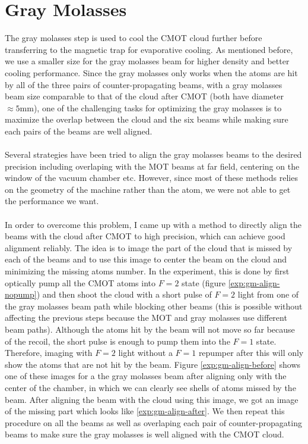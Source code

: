 \section{Gray Molasses}\label{exp:gm}
The gray molasses step is used to cool the CMOT cloud further before transferring to the magnetic trap for evaporative cooling. As mentioned before, we use a smaller size for the gray molasses beam for higher density and better cooling performance. Since the gray molasses only works when the atoms are hit by all of the three pairs of counter-propagating beams, with a gray molasses beam size comparable to that of the cloud after CMOT (both have diameter $\approx5\text{mm}$), one of the challenging tasks for optimizing the gray molasses is to maximize the overlap between the cloud and the six beams while making sure each pairs of the beams are well aligned.\\
\\
Several strategies have been tried to align the gray molasses beams to the desired precision including overlaping with the MOT beams at far field, centering on the window of the vacuum chamber etc. However, since most of these methods relies on the geometry of the machine rather than the atom, we were not able to get the performance we want.\\
\\
In order to overcome this problem, I came up with a method to directly align the beams with the cloud after CMOT to high precision, which can achieve good alignment reliably. The idea is to image the part of the cloud that is missed by each of the beams and to use this image to center the beam on the cloud and minimizing the missing atoms number. In the experiment, this is done by first optically pump all the CMOT atoms into $F=2$ state (figure \ref{exp:gm-align-nopump}) and then shoot the cloud with a short pulse of $F=2$ light from one of the gray molasses beam path while blocking other beams (this is possible without affecting the previous steps because the MOT and gray molasses use different beam paths). Although the atoms hit by the beam will not move so far because of the recoil, the short pulse is enough to pump them into the $F=1$ state. Therefore, imaging with $F=2$ light without a $F=1$ repumper after this will only show the atoms that are not hit by the beam. Figure \ref{exp:gm-align-before} shows one of these images for a the gray molasses beam after aligning only with the center of the chamber, in which we can clearly see shells of atoms missed by the beam. After aligning the beam with the cloud using this image, we got an image of the missing part which looks like \ref{exp:gm-align-after}. We then repeat this procedure on all the beams as well as overlaping each pair of counter-propagating beams to make sure the gray molasses is well aligned with the CMOT cloud.\\
